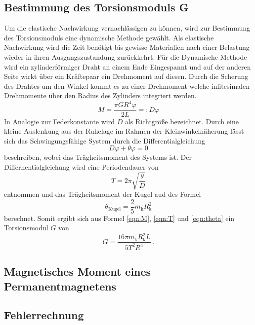\subsection{Bestimmung des Torsionsmoduls G}
Um die elastische Nachwirkung vernachlässigen zu können, wird zur Bestimmung des Torsionsmoduls eine dynamische Methode gewählt. Als elastische Nachwirkung wird die Zeit benötigt bis gewisse Materialien nach einer Belastung wieder in ihren Ausgangszustandung zurückkehrt. 
Für die Dynamische Methode wird ein zylinderförmiger Draht an einem Ende Eingespannt und auf der anderen Seite wirkt über ein Kräftepaar ein Drehmoment auf diesen. Durch die Scherung des Drahtes um den Winkel \alpha kommt es zu einer Drehmoment welche infitesimalen Drehmomente über den Radius des Zylinders  integriert werden. 
\begin{equation}
  M = \frac{\pi G R^4 \varphi}{2L} =: D \varphi
  \label{eqn:M}
\end{equation}
In Analogie zur Federkonstante wird $D$ als Richtgröße bezeichnet. Durch eine kleine Auslenkung aus der Ruhelage im Rahmen der Kleinwinkelnäherung lässt sich das Schwingungsfähige System durch die Differentialgleichung 
\begin{equation}
  D \varphi + \theta \varphi = 0
  \label{eqn:dgl}
\end{equation}
beschreiben, wobei \theta das Trägheitsmoment des Systems ist. Der Differnentialgleichung wird eine Periodendauer von 
\begin{equation}
  T = 2 \pi \sqrt{\frac{\theta}{D}}
  \label{eqn:T}
\end{equation}
entnommen und das Trägheitsmoment der Kugel aud des Formel 
\begin{equation}
  \theta_\text{Kugel} = \frac{2}{5}m_\text{k}R_\text{k}^2
  \label{eqn:theta}
\end{equation}
berechnet. Somit ergibt sich aus Formel \ref{eqn:M}, \ref{eqn:T} und \ref{eqn:theta} ein Torsionsmodul $G$ von 
\begin{equation}
  G = \frac{16 \pi m_\text{k} R_\text{k}^2 L}{5 T^2 R^4} \ .
  \label{eqn:G}
\end{equation}
\subsection{Magnetisches Moment eines Permanentmagnetens}
\subsection{Fehlerrechnung}
